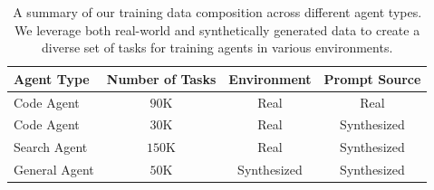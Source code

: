 \begin{table}[htbp]
\small
    \centering
    \begin{tabular}{lccc}
        \toprule
        \textbf{Agent Type} & \textbf{Number of Tasks} & \textbf{Environment} & \textbf{Prompt Source} \\
        \midrule
        Code Agent & $90\textrm{K}$ & Real & Real  \\
        Code Agent & $30\textrm{K}$ & Real & Synthesized \\
        Search Agent & $150\textrm{K}$ & Real & Synthesized \\
        General Agent & $50\textrm{K}$ & Synthesized & Synthesized \\
        \bottomrule
    \end{tabular}
    \caption{A summary of our training data composition across different agent types. We leverage both real-world and synthetically generated data to create a diverse set of tasks for training agents in various environments.}
    \label{tab:agent_tasks}
    
\end{table}